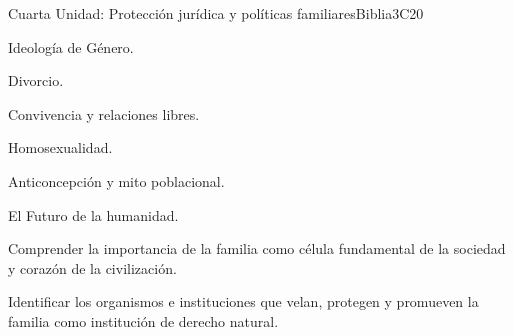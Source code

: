 \begin{syllabus}
\begin{unit}{}{Cuarta Unidad: Protección jurídica y políticas familiares}{Biblia}{3}{C20}
\begin{topics}
	\item Ideología de Género.
	\item Divorcio.
	\item Convivencia y relaciones libres.
	\item Homosexualidad.
	\item Anticoncepción y mito poblacional.
	\item El Futuro de la humanidad.
\end{topics}
\begin{learningoutcomes}
	\item Comprender la importancia de la familia como célula fundamental de la sociedad y corazón de la civilización.
    \item Identificar los organismos e instituciones que velan, protegen y promueven la familia como institución de derecho natural.
\end{learningoutcomes}
\end{unit}



\begin{coursebibliography}
\end{coursebibliography}

\end{syllabus}
